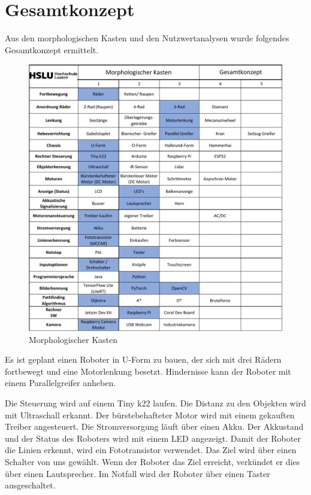 \section{Gesamtkonzept}

Aus den morphologischen Kasten und den Nutzwertanalysen wurde folgendes Gesamtkonzept ermittelt. 

\begin{figure}[H]
\centering
\includegraphics[width=\textwidth -30mm]{assets/MK-Gesamt.pdf}
\caption{Morphologischer Kasten}
\label{fig:mk-all}
\end{figure}

Es ist geplant einen Roboter in U-Form zu bauen, der sich mit drei Rädern fortbewegt und eine Motorlenkung besetzt. Hindernisse kann der Roboter mit einem Parallelgreifer anheben.

Die Steuerung wird auf einem Tiny k22 laufen. Die Distanz zu den Objekten wird mit Ultraschall erkannt. Der bürstebehafteter Motor wird mit einem gekauften Treiber angesteuert. Die Stromversorgung läuft über einen Akku. Der Akkustand und der Status des Roboters wird mit einem LED angezeigt. Damit der Roboter die Linien erkennt, wird ein Fototransistor verwendet. Das Ziel wird über einen Schalter von uns gewählt.
Wenn der Roboter das Ziel erreicht, verkündet er dies über einen Lautsprecher. Im Notfall wird der Roboter über einen Taster ausgeschaltet.

